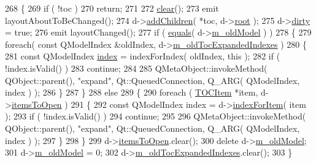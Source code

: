 \begin{DoxyCode}
268 \{
269     \textcolor{keywordflow}{if} ( !toc )
270         \textcolor{keywordflow}{return};
271 
272     \hyperlink{classTOCModel_a13fcb8e3043be00cd784c7f4f212df43}{clear}();
273     emit layoutAboutToBeChanged();
274     d->\hyperlink{classTOCModelPrivate_a22a8c57e804e226a325adf3ff1422eeb}{addChildren}( *toc, d->\hyperlink{classTOCModelPrivate_aef31607506591767d03b45fbadad2362}{root} );
275     d->\hyperlink{classTOCModelPrivate_ac5bc2d2648bec47d5ce8fe03c41484c6}{dirty} = \textcolor{keyword}{true};
276     emit layoutChanged();
277     \textcolor{keywordflow}{if} ( \hyperlink{classTOCModel_a9b92b7bb3d6a3feaff4055616e0379d7}{equals}( d->\hyperlink{classTOCModelPrivate_afda697cbbdd9c302f0f5e4430aec766d}{m\_oldModel} ) )
278     \{
279         \textcolor{keywordflow}{foreach}( \textcolor{keyword}{const} QModelIndex &oldIndex, d->\hyperlink{classTOCModelPrivate_a6d1082a48d7387adb669e7db510fed3d}{m\_oldTocExpandedIndexes} )
280         \{
281             \textcolor{keyword}{const} QModelIndex \hyperlink{classTOCModel_a2ad29438ae7eb6c3085eeeb6cbe6d74d}{index} = indexForIndex( oldIndex, \textcolor{keyword}{this} );
282             \textcolor{keywordflow}{if} ( !index.isValid() )
283                 \textcolor{keywordflow}{continue};
284 
285             QMetaObject::invokeMethod( QObject::parent(), \textcolor{stringliteral}{"expand"}, Qt::QueuedConnection, Q\_ARG( 
      QModelIndex, index ) );
286         \}
287     \}
288     \textcolor{keywordflow}{else}
289     \{
290         \textcolor{keywordflow}{foreach} ( \hyperlink{structTOCItem}{TOCItem} *item, d->\hyperlink{classTOCModelPrivate_a7b72023d2b92b6761a60dd2cd17d0930}{itemsToOpen} )
291         \{
292             \textcolor{keyword}{const} QModelIndex index = d->\hyperlink{classTOCModelPrivate_a800957d9cf750f26fb145fe06c0a3cfa}{indexForItem}( item );
293             \textcolor{keywordflow}{if} ( !index.isValid() )
294                 \textcolor{keywordflow}{continue};
295 
296             QMetaObject::invokeMethod( QObject::parent(), \textcolor{stringliteral}{"expand"}, Qt::QueuedConnection, Q\_ARG( 
      QModelIndex, index ) );
297         \}
298     \}
299     d->\hyperlink{classTOCModelPrivate_a7b72023d2b92b6761a60dd2cd17d0930}{itemsToOpen}.clear();
300     \textcolor{keyword}{delete} d->\hyperlink{classTOCModelPrivate_afda697cbbdd9c302f0f5e4430aec766d}{m\_oldModel};
301     d->\hyperlink{classTOCModelPrivate_afda697cbbdd9c302f0f5e4430aec766d}{m\_oldModel} = 0;
302     d->\hyperlink{classTOCModelPrivate_a6d1082a48d7387adb669e7db510fed3d}{m\_oldTocExpandedIndexes}.clear();
303 \}
\end{DoxyCode}
